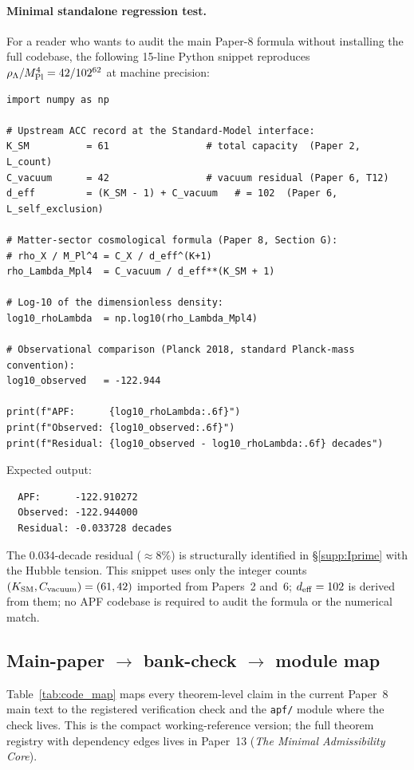 \documentclass[11pt]{article}
\theoremstyle{plain}
\theoremstyle{definition}
\theoremstyle{remark}
\newcommand{\Mpl}{M_{\rm Pl}}
\newcommand{\paperref}[2]{Paper~#1 (\emph{#2})}
\begin{document}
\paragraph{Minimal standalone regression test.}  For a reader who wants to audit the main Paper-8 formula without installing the full codebase, the following 15-line Python snippet reproduces $\rho_\Lambda / \Mpl^4 = 42 / 102^{62}$ at machine precision:

\begin{verbatim}
import numpy as np

# Upstream ACC record at the Standard-Model interface:
K_SM          = 61                 # total capacity  (Paper 2, L_count)
C_vacuum      = 42                 # vacuum residual (Paper 6, T12)
d_eff         = (K_SM - 1) + C_vacuum   # = 102  (Paper 6, L_self_exclusion)

# Matter-sector cosmological formula (Paper 8, Section G):
# rho_X / M_Pl^4 = C_X / d_eff^(K+1)
rho_Lambda_Mpl4  = C_vacuum / d_eff**(K_SM + 1)

# Log-10 of the dimensionless density:
log10_rhoLambda  = np.log10(rho_Lambda_Mpl4)

# Observational comparison (Planck 2018, standard Planck-mass convention):
log10_observed   = -122.944

print(f"APF:      {log10_rhoLambda:.6f}")
print(f"Observed: {log10_observed:.6f}")
print(f"Residual: {log10_observed - log10_rhoLambda:.6f} decades")
\end{verbatim}

Expected output:
\begin{verbatim}
  APF:      -122.910272
  Observed: -122.944000
  Residual: -0.033728 decades
\end{verbatim}

The 0.034-decade residual ($\approx 8\%$) is structurally identified in \S\ref{supp:Iprime} with the Hubble tension.  This snippet uses only the integer counts $(K_{\rm SM}, C_{\rm vacuum}) = (61, 42)$ imported from Papers~2 and~6; $d_{\rm eff} = 102$ is derived from them; no APF codebase is required to audit the formula or the numerical match.

\subsection{Main-paper \texorpdfstring{$\to$}{->} bank-check \texorpdfstring{$\to$}{->} module map}\label{supp:L2}

Table~\ref{tab:code_map} maps every theorem-level claim in the current Paper~8 main text to the registered verification check and the \texttt{apf/} module where the check lives.  This is the compact working-reference version; the full theorem registry with dependency edges lives in \paperref{13}{The Minimal Admissibility Core}.
\end{document}
